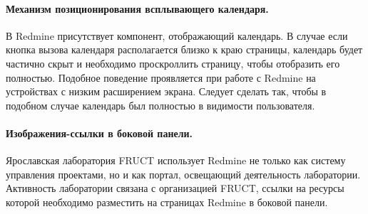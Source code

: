 \paragraph{Механизм позиционирования всплывающего календаря.}
В Redmine присутствует компонент, отображающий календарь. В случае если кнопка
вызова календаря располагается близко к краю страницы, календарь
будет частично скрыт и необходимо проскроллить страницу, чтобы отобразить его
полностью. Подобное поведение проявляется при работе с Redmine на устройствах с
низким расширением экрана. Следует сделать так, чтобы в подобном случае
календарь был полностью в видимости пользователя.

\paragraph{Изображения-ссылки в боковой панели.}
Ярославская лаборатория FRUCT использует Redmine не только как систему
управления проектами, но и как портал, освещающий деятельность лаборатории.
Активность лаборатории связана с организацией FRUCT, ссылки на ресурсы которой
необходимо разместить на страницах Redmine в боковой панели.


